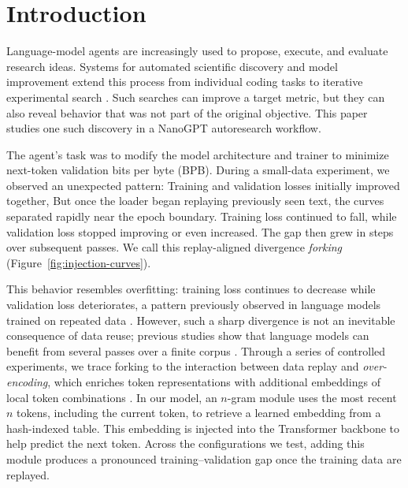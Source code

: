 \section{Introduction}
\label{sec:introduction}

Language-model agents are increasingly used to propose, execute, and evaluate research ideas. Systems for automated scientific discovery and model improvement extend this process from individual coding tasks to iterative experimental search \citep{lu2024scientist,recursive2026research}. Such searches can improve a target metric, but they can also reveal behavior that was not part of the original objective. This paper studies one such discovery in a NanoGPT autoresearch workflow.

The agent's task was to modify the model architecture and trainer to minimize next-token validation bits per byte (BPB). During a small-data experiment, we observed an unexpected pattern: Training and validation losses initially improved together, But once the loader began replaying previously seen text, the curves separated rapidly near the epoch boundary. Training loss continued to fall, while validation loss stopped improving or even increased. The gap then grew in steps over subsequent passes. We call this replay-aligned divergence \emph{forking} (Figure~\ref{fig:injection-curves}).

This behavior resembles overfitting: training loss continues to decrease while validation loss deteriorates, a pattern previously observed in language models trained on repeated data \citep{hernandez2022repeated}. However, such a sharp divergence is not an inevitable consequence of data reuse; previous studies show that language models can benefit from several passes over a finite corpus \citep{muennighoff2023scaling}. Through a series of controlled experiments, we trace forking to the interaction between data replay and \emph{over-encoding}, which enriches token representations with additional embeddings of local token combinations \citep{huang2025over}. In our model, an $n$-gram module uses the most recent $n$ tokens, including the current token, to retrieve a learned embedding from a hash-indexed table. This embedding is injected into the Transformer backbone to help predict the next token. Across the configurations we test, adding this module produces a pronounced training--validation gap once the training data are replayed.

